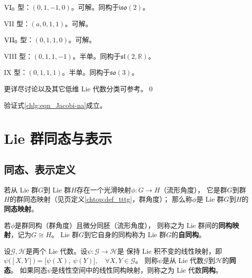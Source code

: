{$\rm VI_0$ 型}：$(0,1,-1,0)$。可解。同构于$\mathfrak{iso}(2)$。

{VII 型}：$(a,0,1,1)$。可解。

{$\rm VII_0$ 型}：$(0,1,1,0)$。可解。

{VIII 型}：$(0,1,1,-1)$。半单。同构于$\mathfrak{sl}(2,\mathbb{R})$。

{IX 型}：$(0,1,1,1)$。半单。同构于$\mathfrak{so}(3)$。


更详尽讨论以及其它低维 Lie 代数分类可参考\parencite{Popovych_2003}。\qed

\begin{exercise}
	验证式\eqref{chlg:eqn_Jacobi-na}成立。
\end{exercise}


\section{ Lie 群同态与表示}\label{chlg:sec_liesg}


\subsection{同态、表示定义}\label{chlg:sec_lieiso}
\begin{definition}\label{chlg:def_homomorphism-LG}
    若从 Lie 群$G$到 Lie 群$H$存在一个{\kaishu 光滑映射}$\phi:G\to H$（流形角度），
    它是群$G$到群$H$的群同态映射（见\pageref{chtop:def_tttg}页定义\ref{chtop:def_tttg}，群角度）；
    那么称$\phi$是 Lie 群$G$到$H$的\textbf{同态映射}。
    
    若$\phi$是群同构（群角度）且微分同胚（流形角度），
    则称之为 Lie 群间的\textbf{同构映射}，记为$G \cong H$。
     Lie 群$G$到它自身的同构称为 Lie 群$G$的\textbf{自同构}。
\end{definition}


\begin{definition}\label{chlg:def_homomorphism-LA}
    设$\mathscr{G},\mathscr{H}$是两个 Lie 代数。设$\psi:\mathscr{G}\to \mathscr{H}$是
    保持 Lie 积不变的线性映射，即
       $ \psi\bigl([X, Y]\bigr) = \bigl[\psi(X),\ \psi(Y)\bigr],
        \quad \forall X, Y \in \mathscr{G} $。
    则称$\psi$是从 Lie 代数$\mathscr{G}$到$\mathscr{H}$的\textbf{同态}。
    如果同态$\psi$是线性空间中的线性同构映射，则称之为 Lie 代数\textbf{同构}。
\end{definition}

